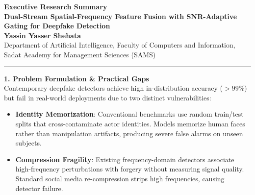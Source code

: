\documentclass[10pt,a4paper]{article}
\begin{document}
\begin{center}
    {\LARGE \textbf{Executive Research Summary}}\\[0.9ex]
    {\large \textbf{Dual-Stream Spatial-Frequency Feature Fusion with SNR-Adaptive Gating for Deepfake Detection}}\\[0.9ex]
    {\normalsize \textbf{Yassin Yasser Shehata}} \\[0.4ex]
    {\footnotesize Department of Artificial Intelligence, Faculty of Computers and Information, Sadat Academy for Management Sciences (SAMS)}
\end{center}

\vspace{-1.0ex}
\noindent\rule{\textwidth}{0.8pt}
\vspace{-1.2ex}

\noindent\textbf{1. Problem Formulation \& Practical Gaps}\\
Contemporary deepfake detectors achieve high in-distribution accuracy ($>99\%$) but fail in real-world deployments due to two distinct vulnerabilities:
\begin{itemize}[leftmargin=*,noitemsep,topsep=2pt]
    \item \textbf{Identity Memorization}: Conventional benchmarks use random train/test splits that cross-contaminate actor identities. Models memorize human faces rather than manipulation artifacts, producing severe false alarms on unseen subjects.
    \item \textbf{Compression Fragility}: Existing frequency-domain detectors associate high-frequency perturbations with forgery without measuring signal quality. Standard social media re-compression strips high frequencies, causing detector failure.
\end{itemize}
\end{document}
